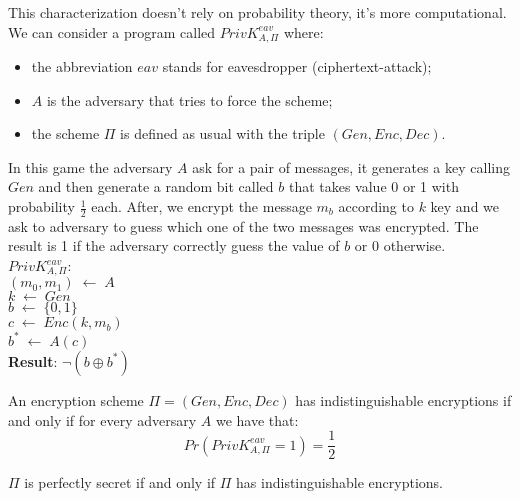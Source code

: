 \documentclass[../main]{subfiles}
\begin{document}
This characterization doesn't rely on probability theory, it's more computational.
We can consider a program called $PrivK^{eav}_{A, \Pi}$ where:
\begin{itemize}
    \item the abbreviation $eav$ stands for eavesdropper (ciphertext-attack);
    \item $A$ is the adversary that tries to force the scheme;
    \item the scheme $\Pi$ is defined as usual with the triple $(Gen, Enc, Dec)$.
\end{itemize}
In this game the adversary $A$ ask for a pair of messages, it generates a key calling $Gen$ and then generate a random bit called $b$ that takes value 0 or 1 with probability $\frac{1}{2}$ each. After, we encrypt the message $m_b$ according to $k$ key and we ask to adversary to guess which one of the two messages was encrypted. The result is 1 if the adversary correctly guess the value of $b$ or 0 otherwise.\\
$PrivK^{eav}_{A,\Pi}$:\\
$(m_0,m_1) \; \leftarrow{} \; A$\\
$k \; \leftarrow{} \; Gen$\\
$b \; \leftarrow{} \; \{0,1\}$\\
$c \; \leftarrow{} \; Enc(k,m_b)$\\
$b^* \; \leftarrow{} \; A(c)$\\
\textbf{Result}: $\neg(b \oplus{} b^*)$

\begin{definition}
    An encryption scheme $\Pi = (Gen, Enc, Dec)$ has indistinguishable encryptions if and only if for every adversary $A$ we have that:$$Pr(PrivK^{eav}_{A,\Pi} = 1) = \frac{1}{2}$$
\end{definition}

\begin{theorem}
    $\Pi$ is perfectly secret if and only if $\Pi$ has indistinguishable encryptions.
\end{theorem}
\end{document}
